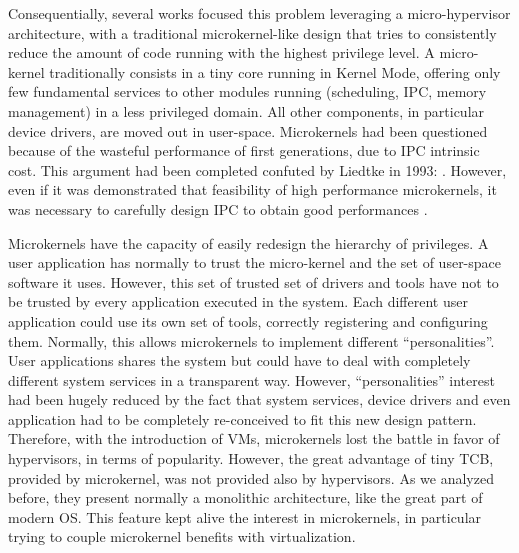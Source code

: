 \documentclass{acm_proc_article-sp} %
\begin{document}

Consequentially, several works focused this problem leveraging a micro-hypervisor architecture, with a traditional microkernel-like design that tries to consistently reduce the amount of code running with the highest privilege level. A micro-kernel traditionally consists in a tiny core running in Kernel Mode, offering only few fundamental services to other modules running (scheduling, IPC, memory management) in a less privileged domain. All other components, in particular device drivers, are moved out in user-space.
Microkernels had been questioned because of the wasteful performance of first generations, due to IPC intrinsic cost. This argument had been completed confuted by Liedtke in 1993: \cite{liedtke1993ImpIPCbyKerDes,liedtke1995micCon}. However, even if it was demonstrated that feasibility of high performance microkernels, it was necessary to carefully design IPC to obtain good performances \cite{Hartig:1997:P9S:269005.266660}.

Microkernels have the capacity of easily redesign the hierarchy of privileges. A user application has normally to trust the micro-kernel and the set of user-space software it uses. However, this set of trusted set of drivers and tools have not to be trusted by every application executed in the system. Each different user application could use its own set of tools, correctly registering and configuring them. Normally, this allows microkernels to implement different ``personalities''. User applications shares the system but could have to deal with completely different system services in a transparent way. However, ``personalities'' interest had been hugely reduced by the fact that system services, device drivers and even application had to be completely re-conceived to fit this new design pattern. Therefore, with the introduction of VMs, microkernels lost the battle in favor of hypervisors, in terms of popularity. However, the great advantage of tiny TCB, provided by microkernel, was not provided also by hypervisors. As we analyzed before, they present normally a monolithic architecture, like the great part of modern OS. This feature kept alive the interest in microkernels, in particular trying to couple microkernel benefits with virtualization.
\end{document}
